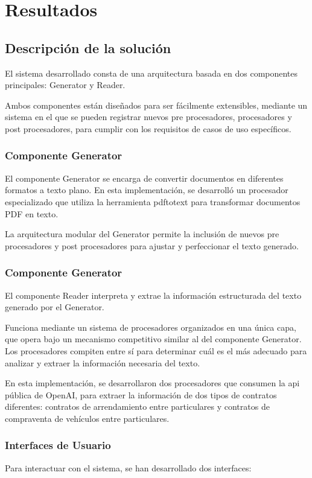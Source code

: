 \chapter{Resultados}\label{ch:chapter_4}


\section{Descripción de la solución}
El sistema desarrollado consta de una arquitectura basada en dos componentes principales: Generator y Reader.

Ambos componentes están diseñados para ser fácilmente extensibles, mediante un sistema en el que se pueden registrar
nuevos pre procesadores, procesadores y post procesadores, para cumplir con los requisitos de casos de uso específicos.

\subsection{Componente Generator}
El componente Generator se encarga de convertir documentos en diferentes formatos a texto plano.
En esta implementación, se desarrolló un procesador especializado que utiliza la herramienta pdftotext para transformar
documentos PDF en texto.

La arquitectura modular del Generator permite la inclusión de nuevos pre procesadores y post procesadores para ajustar y
perfeccionar el texto generado.

\subsection{Componente Generator}
El componente Reader interpreta y extrae la información estructurada del texto generado por el Generator.

Funciona mediante un sistema de procesadores organizados en una única capa, que opera bajo un mecanismo competitivo
similar al del componente Generator.
Los procesadores compiten entre sí para determinar cuál es el más adecuado para analizar y extraer la información
necesaria del texto.

En esta implementación, se desarrollaron dos procesadores que consumen la api pública de OpenAI, para extraer la
información de dos tipos de contratos diferentes: contratos de arrendamiento entre particulares y contratos de
compraventa de vehículos entre particulares.

\subsection{Interfaces de Usuario}
Para interactuar con el sistema, se han desarrollado dos interfaces:

